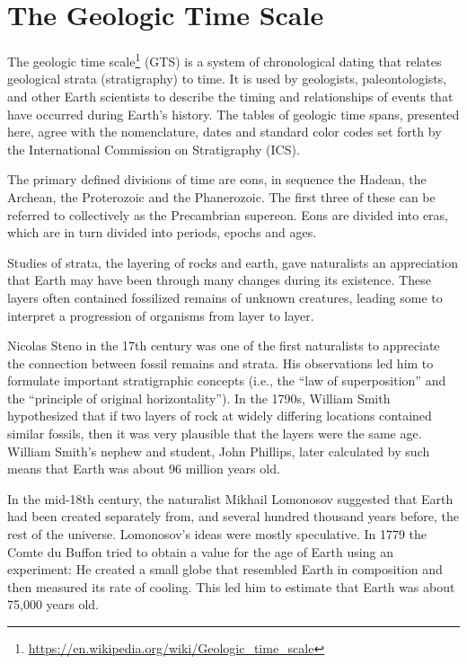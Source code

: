 \documentclass[]{book}
\let\rmarkdownfootnote\footnote%
\def\footnote{\protect\rmarkdownfootnote}
\renewcommand{\href}[2]{#2\footnote{\url{#1}}}
\theoremstyle{definition}
\theoremstyle{definition}
\theoremstyle{definition}
\theoremstyle{remark}
\begin{document}
\section{The Geologic Time Scale}\label{the-geologic-time-scale}

The \href{https://en.wikipedia.org/wiki/Geologic_time_scale}{geologic
time scale} (GTS) is a system of chronological dating that relates
geological strata (stratigraphy) to time. It is used by geologists,
paleontologists, and other Earth scientists to describe the timing and
relationships of events that have occurred during Earth's history. The
tables of geologic time spans, presented here, agree with the
nomenclature, dates and standard color codes set forth by the
International Commission on Stratigraphy (ICS).

The primary defined divisions of time are eons, in sequence the Hadean,
the Archean, the Proterozoic and the Phanerozoic. The first three of
these can be referred to collectively as the Precambrian supereon. Eons
are divided into eras, which are in turn divided into periods, epochs
and ages.

Studies of strata, the layering of rocks and earth, gave naturalists an
appreciation that Earth may have been through many changes during its
existence. These layers often contained fossilized remains of unknown
creatures, leading some to interpret a progression of organisms from
layer to layer.

Nicolas Steno in the 17th century was one of the first naturalists to
appreciate the connection between fossil remains and strata. His
observations led him to formulate important stratigraphic concepts
(i.e., the ``law of superposition'' and the ``principle of original
horizontality''). In the 1790s, William Smith hypothesized that if two
layers of rock at widely differing locations contained similar fossils,
then it was very plausible that the layers were the same age. William
Smith's nephew and student, John Phillips, later calculated by such
means that Earth was about 96 million years old.

In the mid-18th century, the naturalist Mikhail Lomonosov suggested that
Earth had been created separately from, and several hundred thousand
years before, the rest of the universe. Lomonosov's ideas were mostly
speculative. In 1779 the Comte du Buffon tried to obtain a value for the
age of Earth using an experiment: He created a small globe that
resembled Earth in composition and then measured its rate of cooling.
This led him to estimate that Earth was about 75,000 years old.
\end{document}
